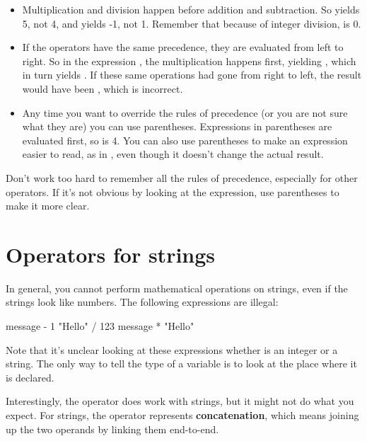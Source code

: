 \begin{itemize}

\item Multiplication and division happen before addition and subtraction.
So  yields 5, not 4, and  yields -1, not 1.
Remember that because of integer division,  is 0.

\item If the operators have the same precedence, they are evaluated from left to right.
So in the expression , the multiplication happens first, yielding , which in turn yields .
If these same operations had gone from right to left, the result would have been , which is incorrect.

\item Any time you want to override the rules of precedence (or you are not sure what they are) you can use parentheses.
Expressions in parentheses are evaluated first, so  is 4.
You can also use parentheses to make an expression easier to read, as in , even though it doesn't change the actual result.

\end{itemize}

Don't work too hard to remember all the rules of precedence, especially for other operators.
If it's not obvious by looking at the expression, use parentheses to make it more clear.


\section{Operators for strings}


In general, you cannot perform mathematical operations on strings, even if the strings look like numbers.
The following expressions are illegal:

\begin{code}
    message - 1     "Hello" / 123     message * "Hello"
\end{code}

Note that it's unclear looking at these expressions whether  is an integer or a string.
The only way to tell the type of a variable is to look at the place where it is declared.


Interestingly, the \java{+} operator does work with strings, but it might not do what you expect.
For strings, the \java{+} operator represents {\bf concatenation}, which means joining up the two operands by linking them end-to-end.

